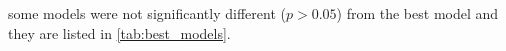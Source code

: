 some models were not significantly different 
($p>0.05$) from the best model and they 
are listed in \autoref{tab:best_models}.


